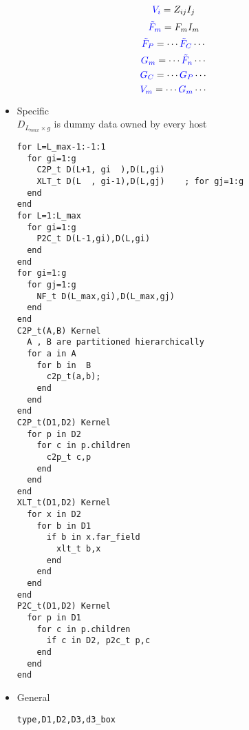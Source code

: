 \documentclass{report}
\begin{document}
\setcounter{equation}{0}
\begin{equation}
\textcolor{blue}{V_i}=Z_{ij}I_j
\end{equation}
\begin{equation}
\textcolor{blue}{\tilde{F}_m}=F_{m}I_m
\end{equation}
\begin{equation}
\textcolor{blue}{\tilde{F}_P}=\cdots\textcolor{blue}{\tilde{F}_{C}}\cdots
\end{equation}
\begin{equation}
\textcolor{blue}{G_m}=\cdots\textcolor{blue}{\tilde{F}_{n}}\cdots
\end{equation}
\begin{equation}
\textcolor{blue}{G_C}=\cdots\textcolor{blue}{G_{P}}\cdots
\end{equation}
\begin{equation}
\textcolor{blue}{V_m}=\cdots\textcolor{blue}{G_{m}}\cdots
\end{equation}
\newpage
\begin{itemize}
\item Specific\\
$D_{L_{max} \times g}$ is dummy data owned by every host 
\begin{verbatim}
for L=L_max-1:-1:1
  for gi=1:g 
    C2P_t D(L+1, gi  ),D(L,gi)
    XLT_t D(L  , gi-1),D(L,gj)    ; for gj=1:g
  end
end
for L=1:L_max
  for gi=1:g
    P2C_t D(L-1,gi),D(L,gi)
  end
end
for gi=1:g
  for gj=1:g
    NF_t D(L_max,gi),D(L_max,gj)
  end
end
C2P_t(A,B) Kernel
  A , B are partitioned hierarchically
  for a in A
    for b in  B
      c2p_t(a,b);
    end 
  end
end
C2P_t(D1,D2) Kernel
  for p in D2
    for c in p.children
      c2p_t c,p
    end
  end
end
XLT_t(D1,D2) Kernel
  for x in D2 
    for b in D1
      if b in x.far_field
        xlt_t b,x
      end
    end
  end
end
P2C_t(D1,D2) Kernel
  for p in D1
    for c in p.children
      if c in D2, p2c_t p,c
    end
  end
end
\end{verbatim}
\item General\\
\begin{verbatim}
type,D1,D2,D3,d3_box


\end{verbatim}
\end{itemize}
\end{document}
